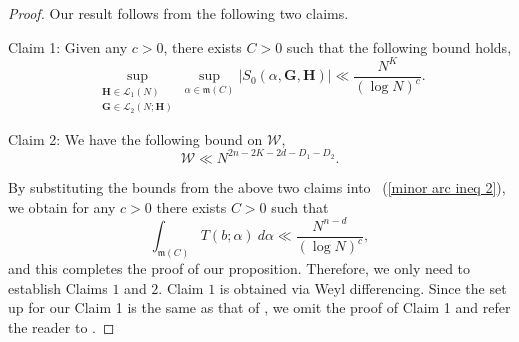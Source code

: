 \documentclass[12pt]{amsart}
\theoremstyle{definition}
\theoremstyle{remark}
\numberwithin{equation}{section}
\begin{document}
\begin{proof}
Our result follows from the following two claims.

Claim 1: Given any $c>0$, there exists $C > 0$ such that the following bound holds,
$$
\sup_{\substack {\mathbf{H} \in \mathcal{L}_1(N) \\ \mathbf{G} \in \mathcal{L}_2(N ; \mathbf{H}) }}  \sup_{\alpha \in \mathfrak{m}(C) } | S_0 (\alpha, \mathbf{G}, \mathbf{H} ) |
\ll \frac{N^K}{(\log N)^c}.
$$

Claim 2: We have the following bound on $\mathcal{W}$,
$$
\mathcal{W} \ll N^{2n - 2K - 2 d - D_1 - D_2}.
$$

By substituting the bounds from the above two claims into ~(\ref{minor arc ineq 2}), we obtain for any $c>0$
there exists $C>0$ such that
$$
\int_{\mathfrak{m}(C)} T({b}; {\alpha} ) \ {d} {\alpha}
\ll
\frac{N^{n - d} }{(\log N)^{c}},
$$
and this completes the proof of our proposition.
Therefore, we only need to establish Claims $1$ and $2$.
Claim $1$ is obtained via Weyl differencing. Since the set up for our Claim 1 is the same as that
of \cite{CM}, we omit the proof of Claim 1 and refer the reader to \cite[pp. 725]{CM}.


\end{proof}
\end{document}
